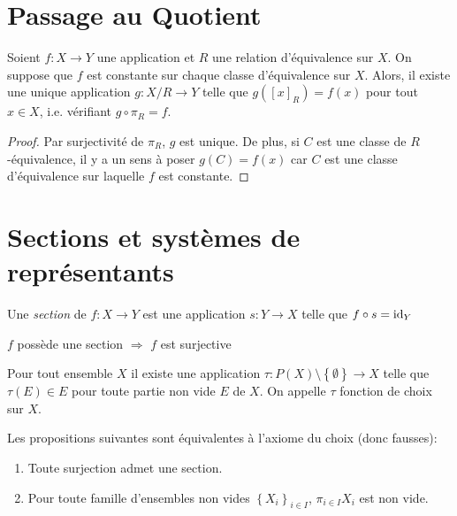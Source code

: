 \documentclass{cours}
\begin{document}
\section{Passage au Quotient}
\begin{theorem}\label{proprietequotient}
    Soient $f : X \rightarrow Y$ une application et $R$ une relation d'équivalence sur $X$. On suppose que $f$ est constante sur chaque classe d'équivalence sur $X$. Alors, il existe une unique application $g : X/R \rightarrow Y$ telle que $g\left(\left[x\right]_{R}\right) = f(x)$ pour tout $x \in X$, i.e. vérifiant $g \circ \pi_{R} = f$.
\end{theorem}
\begin{proof}
    Par surjectivité de $\pi_{R}$, $g$ est unique. De plus, si $C$ est une classe de $R$-équivalence, il y a un sens à poser $g(C) = f(x)$ car $C$ est une classe d'équivalence sur laquelle $f$ est constante.
\end{proof}

\section{Sections et systèmes de représentants}
\begin{definition}
    Une \emph{section} de $f : X \rightarrow Y$ est une application $s : Y \rightarrow X$ telle que $f \circ s = \textmd{id}_{Y}$
\end{definition}
\begin{proposition}
    $f$ possède une section $\Rightarrow$ $f$ est surjective
\end{proposition}

\begin{definition}\label{AC}
    Pour tout ensemble $X$ il existe une application $\tau : P(X) \setminus \left\{\emptyset\right\} \rightarrow X$ telle que $\tau(E) \in E$ pour toute partie non vide $E$ de $X$. On appelle $\tau$ fonction de choix sur $X$. 
\end{definition}

\begin{proposition}
    Les propositions suivantes sont équivalentes à l'axiome du choix (donc fausses): 
    \begin{enumerate}
        \item Toute surjection admet une section.
        \item Pour toute famille d'ensembles non vides $\left\{X_{i}\right\}_{i\in I}$, $\pi_{i\in I}X_{i}$ est non vide.
    \end{enumerate}
\end{proposition}
\end{document}
